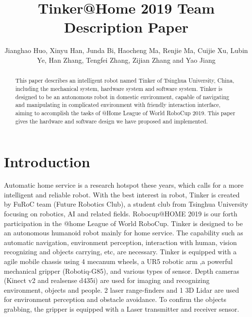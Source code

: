 \documentclass[runningheads,a4paper]{llncs}
\begin{document}
	
\title{Tinker@Home 2019 Team Description Paper}
\author{Jianghao Huo, Xinyu Han, Junda Bi, Haocheng Ma, Renjie Ma, Cuijie Xu, Lubin Ye, Han Zhang, Tengfei Zhang, Zijian Zhang and Yao Jiang}
\maketitle

\begin{abstract}
This paper describes an intelligent robot named Tinker of Tsinghua University, China, including the mechanical system, hardware system and software system. Tinker is designed to be an autonomous robot in domestic environment, capable of navigating and manipulating in complicated environment with friendly interaction interface, aiming to accomplish the tasks of @Home League of World RoboCup 2019. This paper gives the hardware and software design we have proposed and implemented.
\end{abstract}

\section{Introduction}
Automatic home service is a research hotspot these years, which calls for a more intelligent and reliable robot. With the best interest in robot, Tinker is created by FuRoC team (Future Robotics Club), a student club from Tsinghua University focusing on robotics, AI and related fields. Robocup@HOME 2019 is our forth participation in the @home League of World RoboCup. Tinker is designed to be an autonomous humanoid robot mainly for home service. The capability such as automatic navigation, environment perception, interaction with human, vision recognizing and objects carrying, etc, are necessary. Tinker is equipped with a agile mobile chassis using 4 mecanum wheels, a UR5 robotic arm ,a powerful  mechanical gripper (Robotiq-G85), and various types of sensor. Depth cameras (Kinect v2 and realsense d435i) are used for imaging and recognizing environment, objects and people. 2 laser range-finders and 1 3D Lidar are used for environment perception and obstacle avoidance. To confirm the objects grabbing, the gripper is equipped with a Laser transmitter and receiver sensor.
\end{document}
